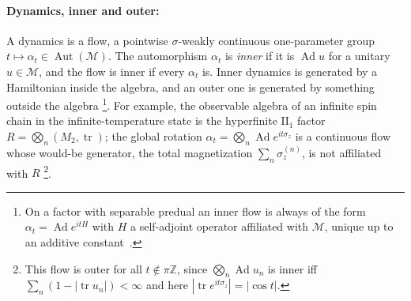 \documentclass[a4paper,11pt]{article}
\theoremstyle{definition}
\begin{document}
\paragraph{Dynamics, inner and outer:}
A dynamics is a flow, a pointwise $\sigma$-weakly continuous one-parameter group $t\mapsto\alpha_t\in\operatorname{Aut}(\mathcal M)$. The automorphism $\alpha_t$ is \emph{inner} if it is $\operatorname{Ad}u$ for a unitary $u\in\mathcal M$, and the flow is inner if every $\alpha_t$ is. Inner dynamics is generated by a Hamiltonian inside the algebra, and an outer one is generated by something outside the algebra \footnote{On a factor with separable predual an inner flow is always of the form $\alpha_t=\operatorname{Ad}e^{itH}$ with $H$ a self-adjoint operator affiliated with $\mathcal M$, unique up to an additive constant~\cite{Kallman1971}.}. For example, the observable algebra of an infinite spin chain in the infinite-temperature state is the hyperfinite $\mathrm{II}_1$ factor $R=\bigotimes_n(M_2,\operatorname{tr})$; the global rotation $\alpha_t=\bigotimes_n\operatorname{Ad}e^{it\sigma_z}$ is a continuous flow whose would-be generator, the total magnetization $\sum_n\sigma_z^{(n)}$, is not affiliated with $R$ \footnote{This flow is outer for all $t\notin\pi\mathbb Z$, since $\bigotimes_n\operatorname{Ad}u_n$ is inner iff $\sum_n(1-|\operatorname{tr}u_n|)<\infty$ and here $|\operatorname{tr}e^{it\sigma_z}|=|\cos t|$.}.

\end{document}
